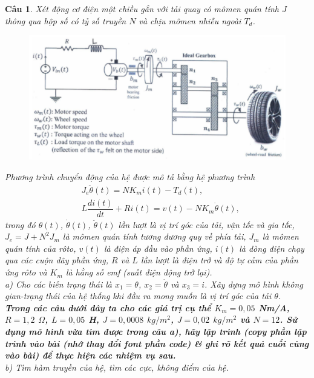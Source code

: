 \documentclass[11pt]{article}
\newtheorem{bt}{Câu}
\begin{document}
\begin{bt} 
Xét động cơ điện một chiều gắn với tải quay có mômen quán tính $J$ thông qua hộp số có tỷ số truyền $N$ và chịu mômen nhiễu ngoài $T_d$. 

\begin{figure}[h!]
	\centering
	\includegraphics[width=0.7\linewidth]{dcmotor}
	\caption{}
	\label{fig:dcmotor}
\end{figure}

Phương trình chuyển động của hệ được mô tả bằng 
hệ phương trình
%
\begin{align}
& J_e \ddot{\theta}(t) = N K_m i(t) - T_d(t), \\
& L \dfrac{di(t)}{dt} + R i(t) = v(t) - N K_m \dot{\theta}(t),
\end{align}
%
trong đó $\theta(t)$, $\dot{\theta}(t)$, $\ddot{\theta}(t)$ lần lượt là vị trí góc của tải, vận tốc và gia tốc, $J_e = J + N^2 J_m$ là mômen quán tính tương đương quy về phía tải, $J_m$ là mômen quán tính của rôto, $v(t)$ là điện áp đầu vào phần ứng, $i(t)$ là dòng điện chạy qua các cuộn dây phần ứng, $R$ và $L$ lần lượt là điện trở và độ tự cảm của phần ứng rôto và $K_m$ là hằng số emf (suất điện động trở lại).\\

a) Cho các biến trạng thái là $x_1 = \theta$, $x_2 = \dot{\theta}$ và $x_3=i$. Xây dựng mô hình không gian-trạng thái của hệ thống khi đầu ra mong muốn là vị trí góc của tải $\theta$. \\

\textbf{Trong các câu dưới đây ta cho các giá trị cụ thể  $K_m = 0,05$ Nm/A, $R = 1,2$ $\Omega$, $L = 0,05$ H,  $J = 0,0008$ $kg/m^2$, $J = 0,02$ $kg/m^2$ và $N = 12$. Sử dụng mô hình vừa tìm được trong câu a), hãy lập trình (copy phần lập trình vào bài (nhớ thay đổi font phần code) \& ghi rõ kết quả cuối cùng vào bài) để thực hiện các nhiệm vụ sau.} \\

b) Tìm hàm truyền của hệ, tìm các cực, không điểm của hệ. \\


\end{bt}
\end{document}
